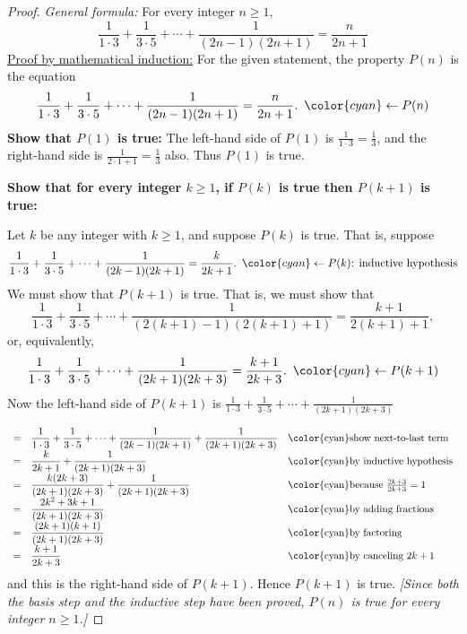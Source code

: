 \documentclass[14pt]{extarticle}
\newcommand{\dps}{\displaystyle}
\newcommand{\from}{\leftarrow}
\newcommand{\cy}{\color{cyan}}
\begin{document}
\begin{proof}
    {\it General formula:} For every integer $n \geq 1$,
    \[
        \dps \frac{1}{1 \cdot 3} + \frac{1}{3 \cdot 5} + \cdots + \frac{1}{(2n-1)(2n+1)} = \frac{n}{2n+1}
    \]
    \underline{Proof by mathematical induction:}
    For the given statement, the property $P(n)$ is the equation
    \[
        \dps \frac{1}{1 \cdot 3} + \frac{1}{3 \cdot 5} + \cdots + \frac{1}{(2n-1)(2n+1)} = \frac{n}{2n+1}. \,\,\, {\cy \from P(n)}
    \]
    {\bf Show that $P(1)$ is true:} The left-hand side of $P(1)$ is $\dps \frac{1}{1 \cdot 3} = \frac{1}{3}$, and the right-hand side is $\dps \frac{1}{2 \cdot 1 + 1} = \frac{1}{3}$ also. Thus $P(1)$ is true.

        {\bf Show that for every integer $k \geq 1$, if $P(k)$ is true then $P(k + 1)$ is true:}

    Let $k$ be any integer with $k \geq 1$, and suppose $P(k)$ is true. That is, suppose
    \[
        \dps \frac{1}{1 \cdot 3} + \frac{1}{3 \cdot 5} + \cdots + \frac{1}{(2k-1)(2k+1)} = \frac{k}{2k+1}. \,\,\, {\cy \from P(k) \text{: inductive hypothesis}}
    \]
    We must show that $P(k + 1)$ is true. That is, we must show that
    \[
        \dps \frac{1}{1 \cdot 3} + \frac{1}{3 \cdot 5} + \cdots + \frac{1}{(2(k+1)-1)(2(k+1)+1)} = \frac{k+1}{2(k+1)+1},
    \]
    or, equivalently,
    \[
        \dps \frac{1}{1 \cdot 3} + \frac{1}{3 \cdot 5} + \cdots + \frac{1}{(2k+1)(2k+3)} = \frac{k+1}{2k+3}. \,\,\,{\cy \from P(k+1)}
    \]
    Now the left-hand side of $P(k + 1)$ is $\dps \frac{1}{1 \cdot 3} + \frac{1}{3 \cdot 5} + \cdots + \frac{1}{(2k+1) (2k+3)}$

    \[
        \begin{array}{lll}
            = & \dps \frac{1}{1 \cdot 3} + \frac{1}{3 \cdot 5} + \cdots + \frac{1}{(2k-1)(2k+1)} + \frac{1}{(2k+1)(2k+3)} & \text{\cy show next-to-last term}          \\
            = & \dps \frac{k}{2k+1} + \frac{1}{(2k+1)(2k+3)}                                                              & \text{\cy by inductive hypothesis}         \\
            = & \dps \frac{k(2k+3)}{(2k+1)(2k+3)} + \frac{1}{(2k+1)(2k+3)}                                                & \text{\cy because $\frac{2k+3}{2k+3} = 1$} \\
            = & \dps \frac{2k^2+3k+1}{(2k+1)(2k+3)}                                                                       & \text{\cy by adding fractions}             \\
            = & \dps \frac{(2k+1)(k+1)}{(2k+1)(2k+3)}                                                                     & \text{\cy by factoring}                    \\
            = & \dps \frac{k+1}{2k+3}                                                                                     & \text{\cy by canceling $2k+1$}
        \end{array}
    \]
    and this is the right-hand side of $P(k + 1)$. Hence $P(k + 1)$ is true. {\it [Since both the basis step and the inductive step have been proved, $P(n)$ is true for every integer $n \geq 1$.]}
\end{proof}
\end{document}

